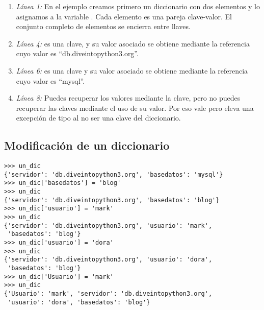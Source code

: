 \begin{enumerate}

\item \emph{Línea 1:} En el ejemplo creamos primero un diccionario con dos elementos y lo asignamos a la variable . Cada elemento es una pareja clave-valor. El conjunto completo de elementos se encierra entre llaves.

\item \emph{Línea 4:}  es una clave, y su valor asociado se obtiene mediante la referencia  cuyo valor es ``db.diveintopython3.org''.

\item \emph{Línea 6:}  es una clave y su valor asociado se obtiene mediante la referencia  cuyo valor es ``mysql''.

\item \emph{Línea 8:} Puedes recuperar los valores mediante la clave, pero no puedes recuperar las claves mediante el uso de su valor. Por eso  vale  pero  eleva una excepción de tipo  al no ser una clave del diccionario.

\end{enumerate}

\subsection{Modificación de un diccionario}

\noindent\begin{minipage}{\textwidth}
\begin{lstlisting}[mathescape=True]
>>> un_dic
{'servidor': 'db.diveintopython3.org', 'basedatos': 'mysql'}
>>> un_dic['basedatos'] = 'blog'
>>> un_dic
{'servidor': 'db.diveintopython3.org', 'basedatos': 'blog'}
>>> un_dic['usuario'] = 'mark'
>>> un_dic
{'servidor': 'db.diveintopython3.org', 'usuario': 'mark', 
 'basedatos': 'blog'}
>>> un_dic['usuario'] = 'dora'
>>> un_dic
{'servidor': 'db.diveintopython3.org', 'usuario': 'dora', 
 'basedatos': 'blog'}
>>> un_dic['Usuario'] = 'mark'
>>> un_dic
{'Usuario': 'mark', 'servidor': 'db.diveintopython3.org', 
 'usuario': 'dora', 'basedatos': 'blog'}
\end{lstlisting}
\end{minipage}


